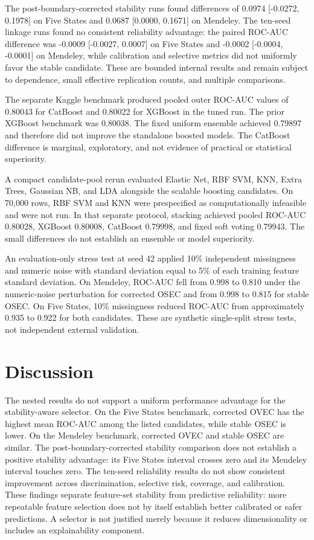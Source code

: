 \documentclass[12pt]{article}
\begin{document}
The post-boundary-corrected stability runs found differences of 0.0974
[-0.0272, 0.1978] on Five States and 0.0687 [0.0000, 0.1671] on Mendeley.
The ten-seed linkage runs found no consistent reliability advantage: the paired
ROC-AUC difference was -0.0009 [-0.0027, 0.0007] on Five States and -0.0002
[-0.0004, -0.0001] on Mendeley, while calibration and selective metrics did
not uniformly favor the stable candidate. These are bounded internal results
and remain subject to dependence, small effective replication counts, and
multiple comparisons.

The separate Kaggle benchmark produced pooled outer ROC-AUC values of 0.80043
for CatBoost and 0.80022 for XGBoost in the tuned run. The prior XGBoost
benchmark was 0.80038. The fixed uniform ensemble achieved 0.79897 and
therefore did not improve the standalone boosted models. The CatBoost
difference is marginal, exploratory, and not evidence of practical or
statistical superiority.

A compact candidate-pool rerun evaluated Elastic Net, RBF SVM, KNN, Extra
Trees, Gaussian NB, and LDA alongside the scalable boosting candidates. On
70,000 rows, RBF SVM and KNN were prespecified as computationally infeasible
and were not run. In that separate protocol, stacking achieved pooled
ROC-AUC 0.80028, XGBoost 0.80008, CatBoost 0.79998, and fixed soft voting
0.79943. The small differences do not establish an ensemble or model
superiority.

An evaluation-only stress test at seed 42 applied 10\% independent missingness
and numeric noise with standard deviation equal to 5\% of each training feature
standard deviation. On Mendeley, ROC-AUC fell from 0.998 to 0.810 under the
numeric-noise perturbation for corrected OSEC and from 0.998 to 0.815 for stable
OSEC. On Five States, 10\% missingness reduced ROC-AUC from approximately 0.935
to 0.922 for both candidates. These are synthetic single-split stress tests,
not independent external validation.

\section{Discussion}
The nested results do not support a uniform performance advantage for the
stability-aware selector. On the Five States benchmark, corrected OVEC has the
highest mean ROC-AUC among the listed candidates, while stable OSEC is lower.
On the Mendeley benchmark, corrected OVEC and stable OSEC are similar. The
post-boundary-corrected stability comparison does not establish a positive
stability advantage: its Five States interval crosses zero and its Mendeley
interval touches zero. The ten-seed reliability results do not show
consistent improvement across discrimination, selective risk, coverage, and
calibration. These findings separate feature-set stability from predictive
reliability: more repeatable feature selection does not by itself establish
better calibrated or safer predictions. A selector is not justified merely
because it reduces dimensionality or includes an explainability component.
\end{document}
